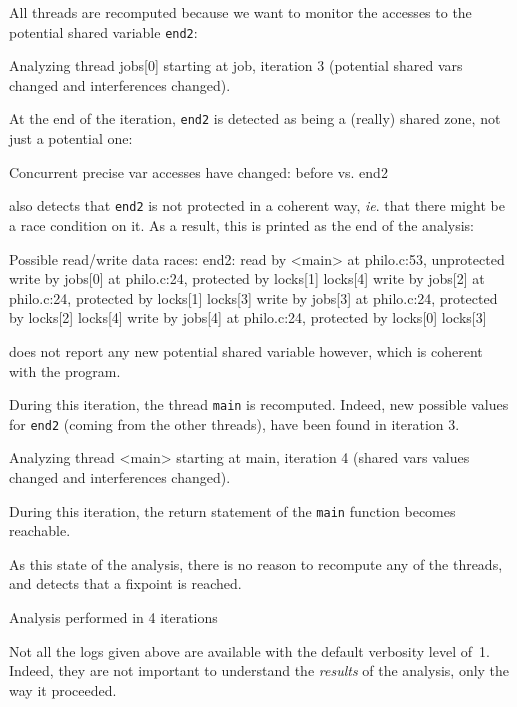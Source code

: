 \documentclass{frama-c-book}
\def\ie.{\emph{ie}.}
\begin{document}
\begin{description}
  All threads are recomputed because we want to monitor the accesses to
the potential shared variable \verb+end2+:
  \begin{logs}
  Analyzing thread jobs[0] starting at job, iteration 3 (potential shared vars
    changed and interferences changed).
  \end{logs}

At the end of the iteration, \verb+end2+ is detected as being a (really) shared
zone, not just a potential one:
\begin{logs}
  Concurrent precise var accesses have changed: before
    \nothing
  vs.
    end2
\end{logs}
\mthread also detects that \verb+end2+ is not protected in a coherent way,
\ie. that there might be a race condition on it.
As a result, this is printed as the end of the analysis:
\begin{logs}
  Possible read/write data races:
    end2:
      read by <main> at philo.c:53, unprotected
      write by jobs[0] at philo.c:24, protected by locks[1] locks[4]
      write by jobs[2] at philo.c:24, protected by locks[1] locks[3]
      write by jobs[3] at philo.c:24, protected by locks[2] locks[4]
      write by jobs[4] at philo.c:24, protected by locks[0] locks[3]
\end{logs}
\mthread does not report any new potential shared variable however, which is
coherent with the program.


\item[Fourth iteration]

During this iteration, the thread \verb+main+ is recomputed. Indeed, new
possible values for \verb+end2+ (coming from the other threads), have been
found in iteration 3.
\begin{logs}
  Analyzing thread <main> starting at main, iteration 4 (shared vars values
    changed and interferences changed).
\end{logs}
During this iteration, the return statement of the \verb+main+ function
becomes reachable.

As this state of the analysis, there is no reason to recompute
any of the threads, and \mthread detects that a fixpoint is reached.
\begin{logs}
 Analysis performed in 4 iterations
\end{logs}
\end{description}
%
Not all the logs given above are available with the default verbosity
level of~1. Indeed, they are not important to understand the
\emph{results} of the analysis, only the way it proceeded.
\end{document}
